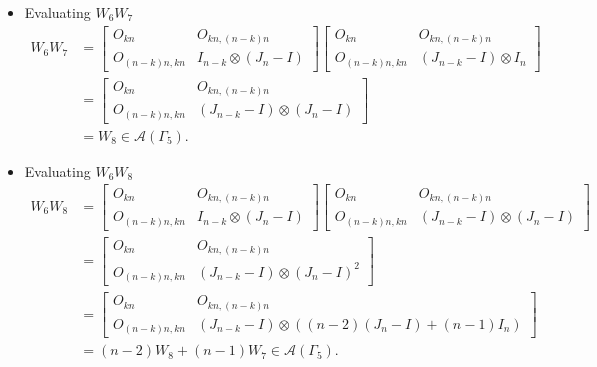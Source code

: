 \begin{itemize}
\item Evaluating $W_{6}W_{7}$
\begin{align*}
    W_6W_7
    &= \begin{bmatrix}
        O_{kn} & O_{kn, (n-k)n} \\
        O_{(n-k)n,kn} & I_{n - k} \otimes (J_n - I)
    \end{bmatrix}
    \begin{bmatrix}
        O_{kn} & O_{kn, (n-k)n} \\
        O_{(n-k)n,kn} & (J_{n-k}-I) \otimes I_n
    \end{bmatrix}\\
    &= \begin{bmatrix}
        O_{kn} & O_{kn, (n-k)n} \\
        O_{(n-k)n,kn} & (J_{n-k}-I) \otimes (J_n - I)
    \end{bmatrix}\\
    &=W_8\in\mathcal{A}(\Gamma_5).
\end{align*}

\item Evaluating $W_{6}W_{8}$
\begin{align*}
    W_6W_8
    &= \begin{bmatrix}
        O_{kn} & O_{kn, (n-k)n} \\
        O_{(n-k)n,kn} & I_{n - k} \otimes (J_n - I)
    \end{bmatrix}
    \begin{bmatrix}
        O_{kn} & O_{kn, (n-k)n} \\
        O_{(n-k)n,kn} & (J_{n-k}-I) \otimes (J_n - I)
    \end{bmatrix}\\
    &= \begin{bmatrix}
        O_{kn} & O_{kn, (n-k)n} \\
        O_{(n-k)n,kn} & (J_{n-k}-I) \otimes (J_n - I)^2
    \end{bmatrix}\\
    &= \begin{bmatrix}
        O_{kn} & O_{kn, (n-k)n} \\
        O_{(n-k)n,kn} & (J_{n-k}-I) \otimes ((n-2)(J_n - I) + (n-1)I_n)
    \end{bmatrix}\\
    &=(n-2)W_8 + (n-1)W_7\in\mathcal{A}(\Gamma_5).
\end{align*}


\end{itemize}

